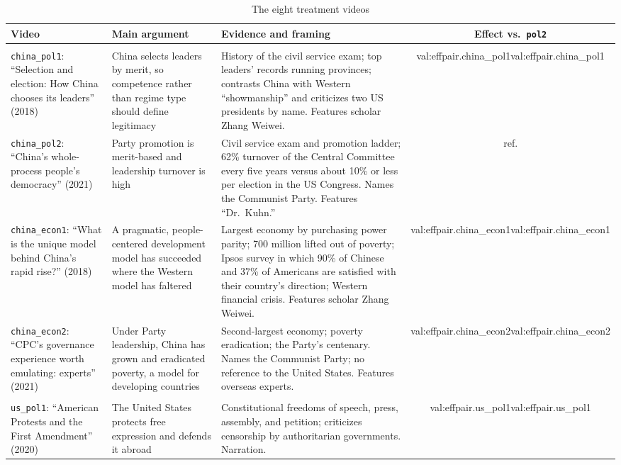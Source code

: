 \documentclass[11pt]{article}
\newcommand{\vid}[1]{\texttt{#1}}
\newcommand{\val}[1]{\ifcsname val:#1\endcsname\else\errmessage{Undefined value: #1}\fi\csname val:#1\endcsname}
\begin{document}
\begin{table}[p]
\centering
\caption{The eight treatment videos}
\label{tab:videocontent}
\footnotesize
\setlength{\tabcolsep}{4pt}
\renewcommand{\arraystretch}{1.2}
\begin{tabular}{>{\raggedright\arraybackslash}p{3.4cm}>{\raggedright\arraybackslash}p{3.6cm}>{\raggedright\arraybackslash}p{5.6cm}c}
\toprule
Video & Main argument & Evidence and framing & Effect vs.\ \vid{pol2} \\
\midrule
\multicolumn{4}{l}{\emph{CGTN}} \\
\vid{china\_pol1}: ``Selection and election: How China chooses its leaders'' (2018) & China selects leaders by merit, so competence rather than regime type should define legitimacy & History of the civil service exam; top leaders' records running provinces; contrasts China with Western ``showmanship'' and criticizes two US presidents by name. Features scholar Zhang Weiwei. & \val{effpair.china_pol1} \\
\vid{china\_pol2}: ``China's whole-process people's democracy'' (2021) & Party promotion is merit-based and leadership turnover is high & Civil service exam and promotion ladder; 62\% turnover of the Central Committee every five years versus about 10\% or less per election in the US Congress. Names the Communist Party. Features ``Dr.\ Kuhn.'' & ref. \\
\vid{china\_econ1}: ``What is the unique model behind China's rapid rise?'' (2018) & A pragmatic, people-centered development model has succeeded where the Western model has faltered & Largest economy by purchasing power parity; 700 million lifted out of poverty; Ipsos survey in which 90\% of Chinese and 37\% of Americans are satisfied with their country's direction; Western financial crisis. Features scholar Zhang Weiwei. & \val{effpair.china_econ1} \\
\vid{china\_econ2}: ``CPC's governance experience worth emulating: experts'' (2021) & Under Party leadership, China has grown and eradicated poverty, a model for developing countries & Second-largest economy; poverty eradication; the Party's centenary. Names the Communist Party; no reference to the United States. Features overseas experts. & \val{effpair.china_econ2} \\
\midrule
\multicolumn{4}{l}{\emph{US State Department}} \\
\vid{us\_pol1}: ``American Protests and the First Amendment'' (2020) & The United States protects free expression and defends it abroad & Constitutional freedoms of speech, press, assembly, and petition; criticizes censorship by authoritarian governments. Narration. & \val{effpair.us_pol1} \\

\end{tabular}
\end{table}
\end{document}

